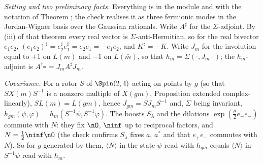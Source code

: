 \emph{Setting and two preliminary facts.} Everything is in the module and with the notation of Theorem ; the check realises it as three fermionic modes in the Jordan-Wigner basis over the Gaussian rationals. Write $A^{\sharp}$ for the $\Sigma$-adjoint. By (iii) of that theorem every real vector is $\Sigma$-anti-Hermitian, so for the real bivector $e_{1}e_{2}$, $(e_{1}e_{2})^{\sharp} = e_{2}^{\sharp}e_{1}^{\sharp} = e_{2}e_{1} = -e_{1}e_{2}$, and $K^{\sharp} = -K$. Write $J_{m}$ for the involution equal to $+1$ on $L(m)$ and $-1$ on $L(\bar m)$, so that $h_{m} = \Sigma(\cdot, J_{m}\cdot)$; the $h_{m}$-adjoint is $A^{\dagger_{m}} = J_{m}A^{\sharp}J_{m}$.

\emph{Covariance.} For a rotor $S$ of $\Spin(2,4)$ acting on points by $g$ (so that $SX(m)S^{-1}$ is a nonzero multiple of $X(gm)$, Proposition  extended complex-linearly), $S L(m) = L(gm)$, hence $J_{gm} = SJ_{m}S^{-1}$ and, $\Sigma$ being invariant, $h_{gm}(\psi, \varphi) = h_{m}(S^{-1}\psi, S^{-1}\varphi)$. The boosts $S_{\lambda}$ and the dilations $\exp(\tfrac{\mu}{2}e_{+}e_{-})$ commute with $N$: they fix $\nO$, $\ninf$ up to reciprocal factors, and $N = \tfrac12\ninf\nO$ (the check confirms $S_{\lambda}$ fixes $a$, $a^{*}$ and that $e_{+}e_{-}$ commutes with $N$). So for $g$ generated by them, $\langle N\rangle$ in the state $\psi$ read with $h_{gm}$ equals $\langle N\rangle$ in $S^{-1}\psi$ read with $h_{m}$.

